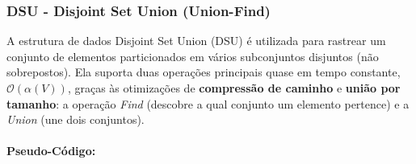 \subsubsection{DSU - Disjoint Set Union (Union-Find)}
A estrutura de dados Disjoint Set Union (DSU) é utilizada para rastrear um
conjunto de elementos particionados em vários subconjuntos disjuntos (não
sobrepostos). Ela suporta duas operações principais quase em tempo constante,
$\mathcal{O}(\alpha(V))$, graças às otimizações de \textbf{compressão de
    caminho} e \textbf{união por tamanho}: a operação \textit{Find} (descobre a
qual conjunto um elemento pertence) e a \textit{Union} (une dois conjuntos).

\paragraph{Pseudo-Código: }\mbox{}\\
\begin{algorithm}[H]
    \SetAlgoLined


    \vspace{0.2cm}

    \caption{Disjoint Set Union (DSU)}
\end{algorithm}

